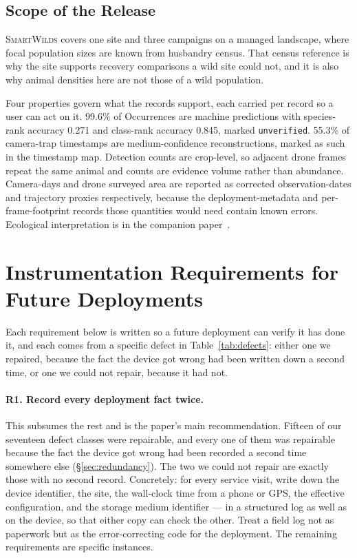 \documentclass[sigconf]{acmart}
\newcommand{\smartwilds}{\textsc{SmartWilds}\xspace}
\begin{document}
\subsection{Scope of the Release}

\smartwilds covers one site and three campaigns on a managed landscape,
where focal population sizes are known from husbandry census. That
census reference is why the site supports recovery comparisons a wild
site could not, and it is also why animal densities here are not those
of a wild population.

Four properties govern what the records support, each carried per record
so a user can act on it. 99.6\% of Occurrences are machine predictions
with species-rank accuracy 0.271 and class-rank accuracy 0.845, marked
\texttt{unverified}. 55.3\% of camera-trap timestamps are
medium-confidence reconstructions, marked as such in the timestamp map.
Detection counts are crop-level, so adjacent drone frames repeat the
same animal and counts are evidence volume rather than abundance.
Camera-days and drone surveyed area are reported as corrected
observation-dates and trajectory proxies respectively, because the
deployment-metadata and per-frame-footprint records those quantities
would need contain known errors. Ecological interpretation is in the
companion paper~\cite{smartwilds_ecology}.

\section{Instrumentation Requirements for Future Deployments}
\label{sec:lessons}

Each requirement below is written so a future deployment can verify it
has done it, and each comes from a specific defect in
Table~\ref{tab:defects}: either one we repaired, because the fact the
device got wrong had been written down a second time, or one we could
not repair, because it had not.

\paragraph{R1. Record every deployment fact twice.}
This subsumes the rest and is the paper's main recommendation.
Fifteen of our seventeen defect classes were repairable, and every one
of them was repairable because the fact the device got wrong had been
recorded a second time somewhere else (\S\ref{sec:redundancy}).
The two we could not repair are exactly those with no second record.
Concretely: for every service visit, write down the device identifier,
the site, the wall-clock time from a phone or GPS, the effective
configuration, and the storage medium identifier --- in a structured log
as well as on the device, so that either copy can check the other. Treat a field log not as paperwork but as the
error-correcting code for the deployment. The remaining requirements are
specific instances.
\end{document}
